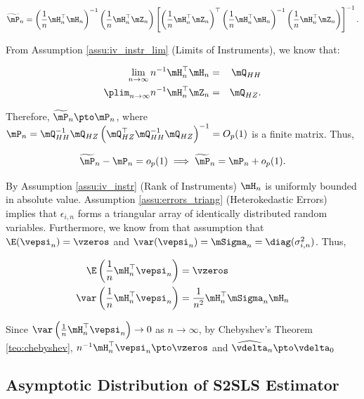 \documentclass[english,12pt]{book}\usepackage[]{graphicx}\usepackage[]{xcolor}
\begin{document}
\begin{equation*}
  \widetilde{\mP}_n = \left(\frac{1}{n}\mH^\top_n\mH_n\right)^{-1}\left(\frac{1}{n}\mH_n^\top\mZ_n \right)\left[\left(\frac{1}{n}\mH^\top_n\mZ_n\right)^\top\left(\frac{1}{n}\mH^\top_n\mH_n\right)^{-1}\left(\frac{1}{n}\mH^\top_n\mZ_n\right)\right]^{-1}.
\end{equation*}


From Assumption \ref{assu:iv_instr_lim} (Limits of Instruments), we know that:

\begin{eqnarray*}
\lim_{n\to \infty} n^{-1}\mH_n^\top\mH_n &=& \mQ_{HH}\\
\plim_{n\to \infty} n^{-1}\mH_n^\top\mZ_n &=& \mQ_{HZ}.
\end{eqnarray*}


Therefore,  $\widetilde{\mP}_n\pto \mP_n$, where $\mP_n=\mQ_{HH}^{-1}\mQ_{HZ}\left(\mQ_{HZ}^\top\mQ_{HH}^{-1}\mQ_{HZ}\right)^{-1}=O_p(1)$ is a finite matrix. Thus,

\begin{equation}\label{eq:P_conver}
\widetilde{\mP}_n - \mP_n = o_p(1)\implies \widetilde{\mP}_n= \mP_n + o_p(1). 
\end{equation}

By Assumption \ref{assu:iv_instr} (Rank of Instruments) $\mH_n$ is uniformly bounded in absolute value. Assumption \ref{assu:errors_triang} (Heterokedastic Errors) implies that $\epsilon_{i,n}$ forms a triangular array of identically distributed random variables. Furthermore, we know from that assumption that  $\E(\vepsi_n) = \vzeros$ and $\var(\vepsi_n) = \mSigma_n =\diag(\sigma^2_{i, n})$. Thus,

\begin{equation*}
  \begin{aligned}
    \E\left(\frac{1}{n}\mH^\top_n\vepsi_n\right)   & = \vzeros \\
    \var\left(\frac{1}{n}\mH^\top_n\vepsi_n\right) & = \frac{1}{n^2}\mH^\top_n\mSigma_n\mH_n
  \end{aligned}
\end{equation*}

Since $\var\left(\frac{1}{n}\mH^\top_n\vepsi_n\right)\to 0$ as $n\to \infty$,  by Chebyshev's Theorem \ref{teo:chebyshev}, $n^{-1}\mH^\top_n\vepsi_n\pto \vzeros$ and $\widehat{\vdelta}_n\pto \vdelta_0$


\subsection{Asymptotic Distribution of S2SLS Estimator}
\end{document}
